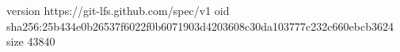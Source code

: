 version https://git-lfs.github.com/spec/v1
oid sha256:25b434e0b26537f6022f0b6071903d4203608c30da103777c232c660ebcb3624
size 43840
